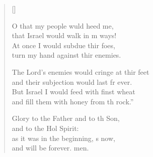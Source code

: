 \begin{verse}[\versewidth]
\begin{patverse}
O that my people wuld heed me,\Med\\
that Israel would walk in m ways!\\
At once I would subdue thir foes,\Med\\
turn my hand against thir enemies.

The Lord’s enemies would cringe at thir feet\Med\\
and their subjection would last fr ever.\\
But Israel I would feed with finst wheat\Med\\
and fill them with honey from th rock.”

Glory to the Father and to th Son,\Med\\
and to the Hol Spirit:\\
as it was in the beginning, s now,\Med\\
and will be forever. men. 
  \end{patverse}
\end{verse}
